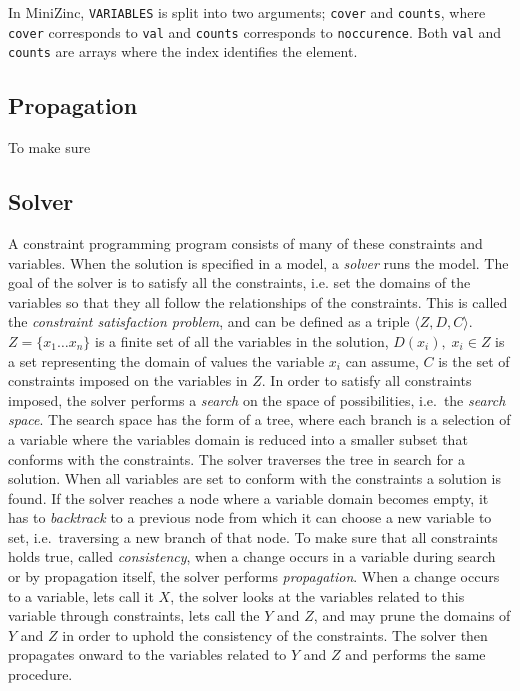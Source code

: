 In MiniZinc, \texttt{VARIABLES} is split into two arguments; \texttt{cover} and \texttt{counts}, where \texttt{cover} corresponds to \texttt{val} and \texttt{counts} corresponds to \texttt{noccurence}. Both \texttt{val} and \texttt{counts} are arrays where the index identifies the element.

\subsection{Propagation}
To make sure 

\subsection{Solver}
A constraint programming program consists of many of these constraints and variables. When the solution is specified in a model, a \emph{solver} runs the model. The goal of the solver is to satisfy all the constraints, i.e. set the domains of the variables so that they all follow the relationships of the constraints. This is called the \emph{constraint satisfaction problem}, and can  be defined as a triple $\langle Z,D,C \rangle$. $Z=\{x_1 \ldots x_n\}$ is a finite set of all the variables in the solution, $D(x_i), \; x_i \in Z$ is a set representing the domain of values the variable $x_i$ can assume, $C$ is the set of constraints imposed on the variables in $Z$. In order to satisfy all constraints imposed, the solver performs a \emph{search} on the space of possibilities, i.e.\ the \emph{search space}. The search space has the form of a tree, where each branch is a selection of a variable where the variables domain is reduced into a smaller subset that conforms with the constraints. The solver traverses the tree in search for a solution. When all variables are set to conform with the constraints a solution is found. If the solver reaches a node where a variable domain becomes empty, it has to \emph{backtrack} to a previous node from which it can choose a new variable to set, i.e.\ traversing a new branch of that node. To make sure that all constraints holds true, called \emph{consistency}, when a change occurs in a variable during search or by propagation itself, the solver performs \emph{propagation}. When a change occurs to a variable, lets call it $X$, the solver looks at the variables related to this variable through constraints, lets call the $Y$ and $Z$, and may prune the domains of $Y$ and $Z$ in order to uphold the consistency of the constraints. The solver then propagates onward to the variables related to $Y$ and $Z$ and performs the same procedure.

